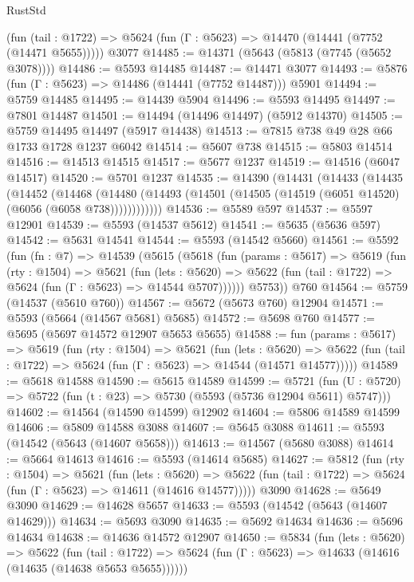 \begin{lexlean}{RustStd}
\begin{coremodule}
    (fun (tail : @1722) => @5624 (fun (Γ : @5623) => @14470 (@14441 (@7752 (@14471 @5655)))))
    @3077
@14485 := @14371 (@5643 (@5813 (@7745 (@5652 @3078))))
@14486 := @5593 @14485
@14487 := @14471 @3077
@14493 := @5876 (fun (Γ : @5623) => @14486 (@14441 (@7752 @14487))) @5901
@14494 := @5759 @14485
@14495 := @14439 @5904
@14496 := @5593 @14495
@14497 := @7801 @14487
@14501 := @14494 (@14496 @14497) (@5912 @14370)
@14505 := @5759 @14495 @14497 (@5917 @14438)
@14513 := @7815 @738 @49 @28 @66 @1733 @1728 @1237 @6042
@14514 := @5607 @738
@14515 := @5803 @14514
@14516 := @14513 @14515
@14517 := @5677 @1237
@14519 := @14516 (@6047 @14517)
@14520 := @5701 @1237
@14535 := @14390
    (@14431
      (@14433
        (@14435
          (@14452
            (@14468
              (@14480 (@14493 (@14501 (@14505 (@14519 (@6051 @14520) (@6056 (@6058 @738))))))))))))
@14536 := @5589 @597
@14537 := @5597 @12901
@14539 := @5593 (@14537 @5612)
@14541 := @5635 (@5636 @597)
@14542 := @5631 @14541
@14544 := @5593 (@14542 @5660)
@14561 := @5592
    (fun (fn : @7) =>
    @14539
      (@5615
        (@5618
          (fun (params : @5617) =>
          @5619
            (fun (rty : @1504) =>
            @5621
              (fun (lets : @5620) =>
              @5622 (fun (tail : @1722) => @5624 (fun (Γ : @5623) => @14544 @5707))))))
        @5753))
    @760
@14564 := @5759 (@14537 (@5610 @760))
@14567 := @5672 (@5673 @760) @12904
@14571 := @5593 (@5664 (@14567 @5681) @5685)
@14572 := @5698 @760
@14577 := @5695 (@5697 @14572 @12907 @5653 @5655)
@14588 := fun (params : @5617) =>
  @5619
    (fun (rty : @1504) =>
    @5621
      (fun (lets : @5620) =>
      @5622 (fun (tail : @1722) => @5624 (fun (Γ : @5623) => @14544 (@14571 @14577)))))
@14589 := @5618 @14588
@14590 := @5615 @14589
@14599 := @5721
    (fun (U : @5720) => @5722 (fun (t : @23) => @5730 (@5593 (@5736 @12904 @5611) @5747)))
@14602 := @14564 (@14590 @14599) @12902
@14604 := @5806 @14589 @14599
@14606 := @5809 @14588 @3088
@14607 := @5645 @3088
@14611 := @5593 (@14542 (@5643 (@14607 @5658)))
@14613 := @14567 (@5680 @3088)
@14614 := @5664 @14613
@14616 := @5593 (@14614 @5685)
@14627 := @5812
    (fun (rty : @1504) =>
    @5621
      (fun (lets : @5620) =>
      @5622 (fun (tail : @1722) => @5624 (fun (Γ : @5623) => @14611 (@14616 @14577)))))
    @3090
@14628 := @5649 @3090
@14629 := @14628 @5657
@14633 := @5593 (@14542 (@5643 (@14607 @14629)))
@14634 := @5693 @3090
@14635 := @5692 @14634
@14636 := @5696 @14634
@14638 := @14636 @14572 @12907
@14650 := @5834
    (fun (lets : @5620) =>
    @5622
      (fun (tail : @1722) =>
      @5624 (fun (Γ : @5623) => @14633 (@14616 (@14635 (@14638 @5653 @5655))))))

\end{coremodule}
\end{lexlean}
